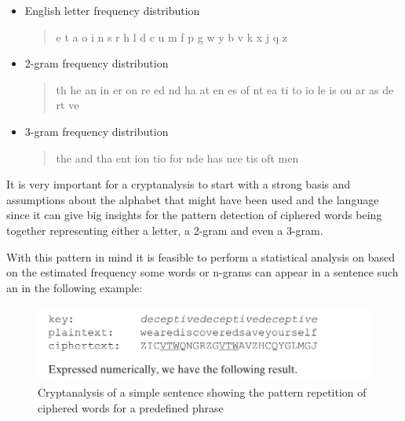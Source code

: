 \documentclass[letterpaper,12pt]{article}
\begin{document}
\begin{itemize}
    \item English letter frequency distribution
    \begin{quote}
        e t a o i n s r h l d c u m f p g w y b v k x j q z
    \end{quote}
    \item 2-gram frequency distribution
    \begin{quote}
         th he an in er on re ed nd ha at en es of nt ea ti to io le is ou ar as de rt ve
    \end{quote}
    \item 3-gram frequency distribution
        \begin{quote}
        the and tha ent ion tio for nde has nce tis oft men
        \end{quote}
\end{itemize}

It is very important for a cryptanalysis to start with a strong basis and assumptions about the alphabet that might have been used and the language since it can give big insights for the pattern detection of ciphered words being together representing either a letter, a 2-gram and even a 3-gram.

With this pattern in mind it is feasible to perform a statistical analysis on based on the estimated frequency some words or n-grams can appear in a sentence such an in the following example:

\begin{figure}[H]
    \centering
    \includegraphics[width=.7\textwidth]{assets/cypher_book.png}
    \caption{Cryptanalysis of a simple sentence showing the pattern repetition of ciphered words for a predefined phrase\cite{WS2017-Vignere}}
\end{figure}

\blindtext %
\end{document}
